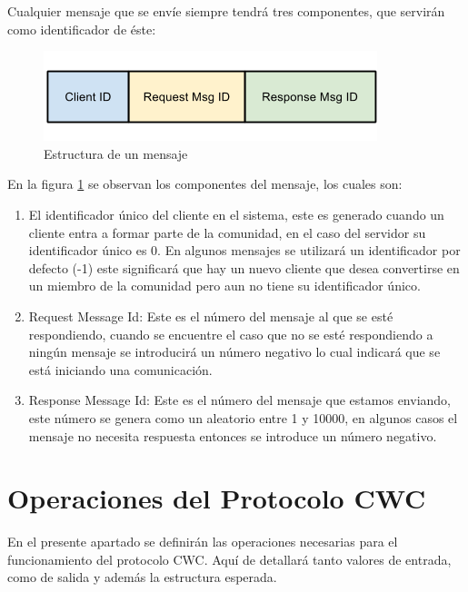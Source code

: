 Cualquier mensaje que se envíe siempre tendrá tres componentes, que servirán como identificador de éste:

\begin{figure}[h]
  \centering
    \includegraphics[scale=0.75]{gfx/EstructuraMensajeCWC}
  \caption{Estructura de un mensaje}
  \label{EstructuraMensajeCWC}
\end{figure}


En la figura \ref{EstructuraMensajeCWC} se observan los componentes del mensaje, los cuales son:

\begin{enumerate}
\item El identificador único del cliente en el sistema, este es generado cuando un cliente entra a formar parte de la comunidad, en el caso del servidor su identificador único es 0. En algunos mensajes se utilizará un identificador por defecto (-1) este significará que hay un nuevo cliente que desea convertirse en un miembro de la comunidad pero aun no tiene su identificador único.

\item Request Message Id: Este es el número del mensaje al que se esté respondiendo, cuando se encuentre el caso que no se esté respondiendo a ningún mensaje se introducirá un número negativo lo cual indicará que se está iniciando una comunicación.

\item Response Message Id: Este es el número del mensaje que estamos enviando, este número se genera como un aleatorio entre 1 y 10000, en algunos casos el mensaje no necesita respuesta entonces se introduce un número negativo.
\end{enumerate}


\section{Operaciones del Protocolo CWC}

En el presente apartado se definirán las operaciones necesarias para el funcionamiento del protocolo CWC. Aquí de detallará tanto valores de entrada, como de salida y además la estructura esperada. 

